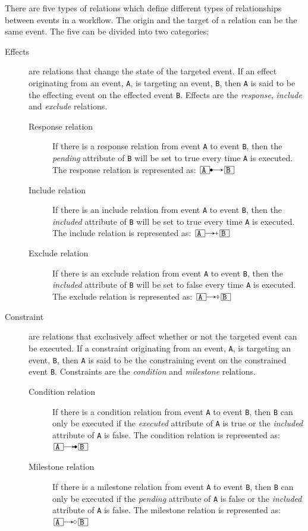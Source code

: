 \documentclass{article}
\begin{document}
			There are five types of relations which define different types of relationships between events in a workflow.
			The origin and the target of a relation can be the same event.
			The five can be divided into two categories:

			\begin{description}
				\item[Effects] are relations that change the state of the targeted event.
				If an effect originating from an event, \texttt{A}, is targeting an event, \texttt{B}, then \texttt{A} is said to be the effecting event on the effected event \texttt{B}.
				Effects are the \emph{response}, \emph{include} and \emph{exclude} relations.
				\begin{description}
					\item[Response relation] If there is a response relation from event \texttt{A} to event \texttt{B}, then the \textit{pending} attribute of \texttt{B} will be set to true every time \texttt{A} is executed.
				The response relation is represented as: $\ev{A} \rrel \ev{B}$
					\item[Include relation] If there is an include relation from event \texttt{A} to event \texttt{B}, then the \textit{included} attribute of \texttt{B} will be set to true every time \texttt{A} is executed.
				The include relation is represented as: $\ev{A} \irel \ev{B}$
					\item[Exclude relation] If there is an exclude relation from event \texttt{A} to event \texttt{B}, then the \textit{included} attribute of \texttt{B} will be set to false every time \texttt{A} is executed.
				The exclude relation is represented as: $\ev{A} \erel \ev{B}$
				\end{description}
				\item[Constraint] are relations that exclusively affect whether or not the targeted event can be executed.
				If a constraint originating from an event, \texttt{A}, is targeting an event, \texttt{B}, then \texttt{A} is said to be the constraining event on the constrained event \texttt{B}.
				Constraints are the \emph{condition} and \emph{milestone} relations.
				\begin{description}
					\item[Condition relation] If there is a condition relation from event \texttt{A} to event \texttt{B}, then \texttt{B} can only be executed if the \textit{executed} attribute of \texttt{A} is true or the \textit{included} attribute of \texttt{A} is false.
				The condition relation is represented as: $\ev{A} \crel \ev{B}$
					\item[Milestone relation] If there is a milestone relation from event \texttt{A} to event \texttt{B}, then \texttt{B} can only be executed if the \textit{pending} attribute of \texttt{A} is false or the \textit{included} attribute of \texttt{A} is false.
				The milestone relation is represented as: $\ev{A} \mrel \ev{B}$
				\end{description}
			\end{description}
\end{document}
